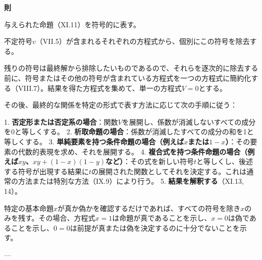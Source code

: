 \documentclass[a4paper,11pt,openany]{ltjsbook}
\begin{document}
\textbf{則}

与えられた命題（XI.11）を符号的に表す。

不定符号$v$（VII.5）が含まれるそれぞれの方程式から、個別にこの符号を除去する。

残りの符号は最終解から排除したいものであるので、それらを逐次的に除去する前に、符号またはその他の符号が含まれている方程式を一つの方程式に簡約化する（VIII.7）。結果を得た方程式を集めて、単一の方程式$V = 0$とする。

その後、最終的な関係を特定の形式で表す方法に応じて次の手順に従う：

1. \textbf{否定形または否定系の場合}：関数$V$を展開し、係数が消滅しないすべての成分を0と等しくする。
2. \textbf{析取命題の場合}：係数が消滅したすべての成分の和を1と等しくする。
3. \textbf{単純要素を持つ条件命題の場合（例えば$x$または$1-x$）}：その要素の代数的表現を求め、それを展開する。
4. \textbf{複合式を持つ条件命題の場合（例えば$xy$、$xy+(1-x)(1-y)$など）}：その式を新しい符号$t$と等しくし、後述する符号が出現する結果に$t$の展開された関数としてそれを決定する。これは通常の方法または特別な方法（IX.9）により行う。
5. \textbf{結果を解釈する}（XI.13, 14）。

特定の基本命題$x$が真か偽かを確認するだけであれば、すべての符号を除き$x$のみを残す。その場合、方程式$x = 1$は命題が真であることを示し、$x = 0$は偽であることを示し、$0 = 0$は前提が真または偽を決定するのに十分でないことを示す。

---
\end{document}
